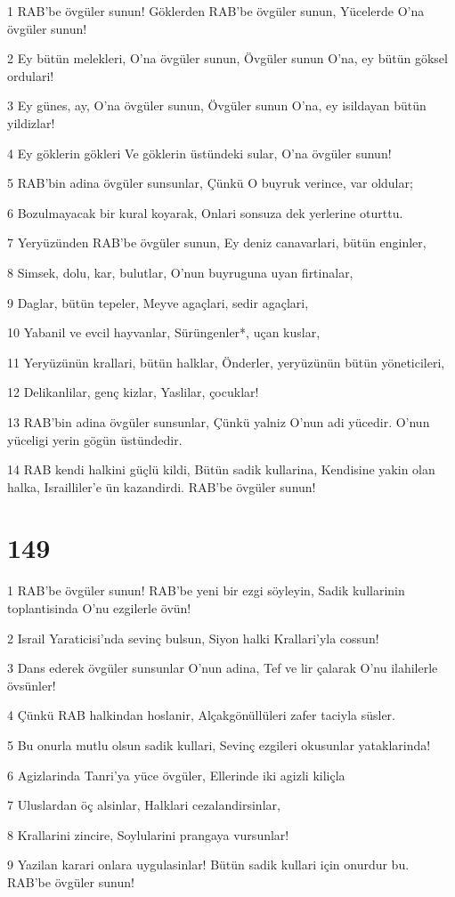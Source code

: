 \par 1 RAB'be övgüler sunun! Göklerden RAB'be övgüler sunun, Yücelerde O'na övgüler sunun!
\par 2 Ey bütün melekleri, O'na övgüler sunun, Övgüler sunun O'na, ey bütün göksel ordulari!
\par 3 Ey günes, ay, O'na övgüler sunun, Övgüler sunun O'na, ey isildayan bütün yildizlar!
\par 4 Ey göklerin gökleri Ve göklerin üstündeki sular, O'na övgüler sunun!
\par 5 RAB'bin adina övgüler sunsunlar, Çünkü O buyruk verince, var oldular;
\par 6 Bozulmayacak bir kural koyarak, Onlari sonsuza dek yerlerine oturttu.
\par 7 Yeryüzünden RAB'be övgüler sunun, Ey deniz canavarlari, bütün enginler,
\par 8 Simsek, dolu, kar, bulutlar, O'nun buyruguna uyan firtinalar,
\par 9 Daglar, bütün tepeler, Meyve agaçlari, sedir agaçlari,
\par 10 Yabanil ve evcil hayvanlar, Sürüngenler*, uçan kuslar,
\par 11 Yeryüzünün krallari, bütün halklar, Önderler, yeryüzünün bütün yöneticileri,
\par 12 Delikanlilar, genç kizlar, Yaslilar, çocuklar!
\par 13 RAB'bin adina övgüler sunsunlar, Çünkü yalniz O'nun adi yücedir. O'nun yüceligi yerin gögün üstündedir.
\par 14 RAB kendi halkini güçlü kildi, Bütün sadik kullarina, Kendisine yakin olan halka, Israilliler'e ün kazandirdi. RAB'be övgüler sunun!

\chapter{149}

\par 1 RAB'be övgüler sunun! RAB'be yeni bir ezgi söyleyin, Sadik kullarinin toplantisinda O'nu ezgilerle övün!
\par 2 Israil Yaraticisi'nda sevinç bulsun, Siyon halki Krallari'yla cossun!
\par 3 Dans ederek övgüler sunsunlar O'nun adina, Tef ve lir çalarak O'nu ilahilerle övsünler!
\par 4 Çünkü RAB halkindan hoslanir, Alçakgönüllüleri zafer taciyla süsler.
\par 5 Bu onurla mutlu olsun sadik kullari, Sevinç ezgileri okusunlar yataklarinda!
\par 6 Agizlarinda Tanri'ya yüce övgüler, Ellerinde iki agizli kiliçla
\par 7 Uluslardan öç alsinlar, Halklari cezalandirsinlar,
\par 8 Krallarini zincire, Soylularini prangaya vursunlar!
\par 9 Yazilan karari onlara uygulasinlar! Bütün sadik kullari için onurdur bu. RAB'be övgüler sunun!

